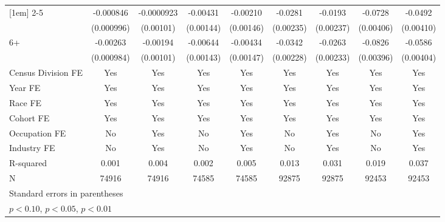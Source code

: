 {\begin{tabular}{l*{4}{c}|*{4}{c}}
[1em]
2-5                 &   -0.000846         &  -0.0000923         &    -0.00431\sym{***}&    -0.00210         &     -0.0281\sym{***}&     -0.0193\sym{***}&     -0.0728\sym{***}&     -0.0492\sym{***}\\
                    &  (0.000996)         &   (0.00101)         &   (0.00144)         &   (0.00146)         &   (0.00235)         &   (0.00237)         &   (0.00406)         &   (0.00410)         \\
[1em]
6+                  &    -0.00263\sym{***}&    -0.00194\sym{*}  &    -0.00644\sym{***}&    -0.00434\sym{***}&     -0.0342\sym{***}&     -0.0263\sym{***}&     -0.0826\sym{***}&     -0.0586\sym{***}\\
                    &  (0.000984)         &   (0.00101)         &   (0.00143)         &   (0.00147)         &   (0.00228)         &   (0.00233)         &   (0.00396)         &   (0.00404)         \\
\hline
Census Division FE  &         Yes         &         Yes         &         Yes         &         Yes         &         Yes         &         Yes         &         Yes         &         Yes         \\
Year FE             &         Yes         &         Yes         &         Yes         &         Yes         &         Yes         &         Yes         &         Yes         &         Yes         \\
Race FE             &         Yes         &         Yes         &         Yes         &         Yes         &         Yes         &         Yes         &         Yes         &         Yes         \\
Cohort FE           &         Yes         &         Yes         &         Yes         &         Yes         &         Yes         &         Yes         &         Yes         &         Yes         \\
Occupation FE       &          No         &         Yes         &          No         &         Yes         &          No         &         Yes         &          No         &         Yes         \\
Industry FE         &          No         &         Yes         &          No         &         Yes         &          No         &         Yes         &          No         &         Yes         \\
R-squared           &       0.001         &       0.004         &       0.002         &       0.005         &       0.013         &       0.031         &       0.019         &       0.037         \\
N                   &       74916         &       74916         &       74585         &       74585         &       92875         &       92875         &       92453         &       92453         \\
\hline\hline
\multicolumn{9}{l}{\footnotesize Standard errors in parentheses}\\
\multicolumn{9}{l}{\footnotesize \sym{*} \(p<0.10\), \sym{**} \(p<0.05\), \sym{***} \(p<0.01\)}\\
\end{tabular}
}

